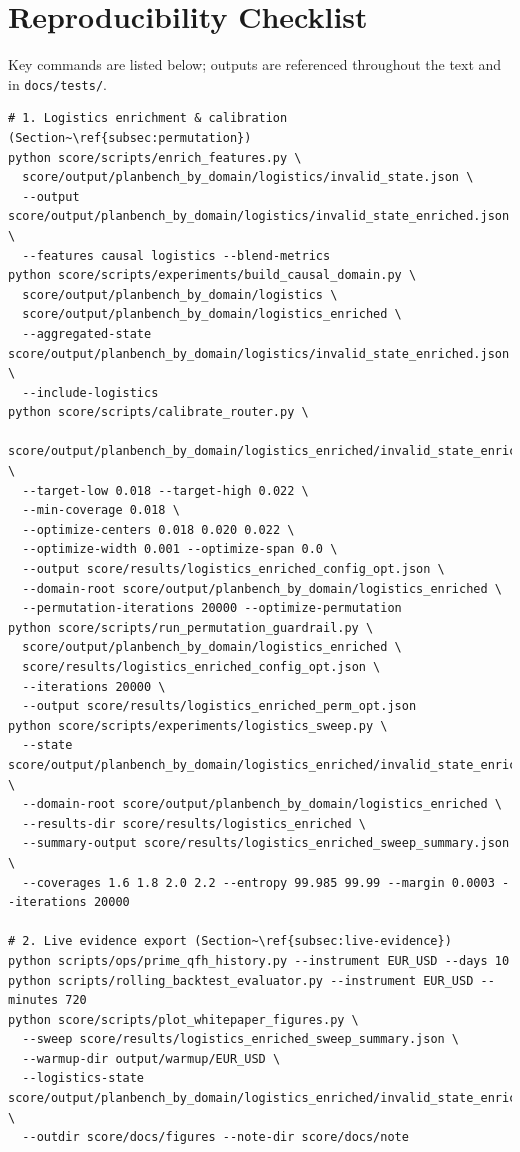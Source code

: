 \documentclass[11pt]{article}
\begin{document}
\appendix

\section{Reproducibility Checklist}
Key commands are listed below; outputs are referenced throughout the text and in
\texttt{docs/tests/}.

\begin{lstlisting}[style=stm]
# 1. Logistics enrichment & calibration (Section~\ref{subsec:permutation})
python score/scripts/enrich_features.py \
  score/output/planbench_by_domain/logistics/invalid_state.json \
  --output score/output/planbench_by_domain/logistics/invalid_state_enriched.json \
  --features causal logistics --blend-metrics
python score/scripts/experiments/build_causal_domain.py \
  score/output/planbench_by_domain/logistics \
  score/output/planbench_by_domain/logistics_enriched \
  --aggregated-state score/output/planbench_by_domain/logistics/invalid_state_enriched.json \
  --include-logistics
python score/scripts/calibrate_router.py \
  score/output/planbench_by_domain/logistics_enriched/invalid_state_enriched.json \
  --target-low 0.018 --target-high 0.022 \
  --min-coverage 0.018 \
  --optimize-centers 0.018 0.020 0.022 \
  --optimize-width 0.001 --optimize-span 0.0 \
  --output score/results/logistics_enriched_config_opt.json \
  --domain-root score/output/planbench_by_domain/logistics_enriched \
  --permutation-iterations 20000 --optimize-permutation
python score/scripts/run_permutation_guardrail.py \
  score/output/planbench_by_domain/logistics_enriched \
  score/results/logistics_enriched_config_opt.json \
  --iterations 20000 \
  --output score/results/logistics_enriched_perm_opt.json
python score/scripts/experiments/logistics_sweep.py \
  --state score/output/planbench_by_domain/logistics_enriched/invalid_state_enriched.json \
  --domain-root score/output/planbench_by_domain/logistics_enriched \
  --results-dir score/results/logistics_enriched \
  --summary-output score/results/logistics_enriched_sweep_summary.json \
  --coverages 1.6 1.8 2.0 2.2 --entropy 99.985 99.99 --margin 0.0003 --iterations 20000

# 2. Live evidence export (Section~\ref{subsec:live-evidence})
python scripts/ops/prime_qfh_history.py --instrument EUR_USD --days 10
python scripts/rolling_backtest_evaluator.py --instrument EUR_USD --minutes 720
python score/scripts/plot_whitepaper_figures.py \
  --sweep score/results/logistics_enriched_sweep_summary.json \
  --warmup-dir output/warmup/EUR_USD \
  --logistics-state score/output/planbench_by_domain/logistics_enriched/invalid_state_enriched.json \
  --outdir score/docs/figures --note-dir score/docs/note


\end{lstlisting}
\end{document}
